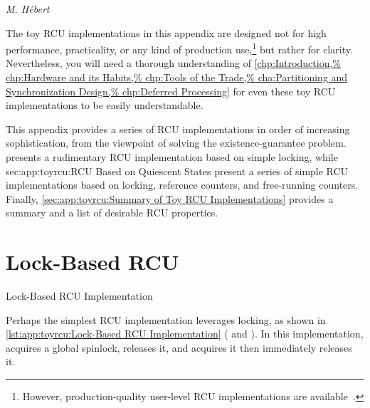 
%
	 {\emph{M. H\'ebert}}

The toy RCU implementations in this appendix are designed not for
high performance, practicality, or any kind of production use,\footnote{
	However, production-quality user-level RCU implementations
	are available~\cite{MathieuDesnoyers2009URCU,MathieuDesnoyers2012URCU}.}
but rather for clarity.
Nevertheless, you will need a thorough understanding of
\cref{chp:Introduction,%
chp:Hardware and its Habits,%
chp:Tools of the Trade,%
cha:Partitioning and Synchronization Design,%
chp:Deferred Processing}
for even these toy RCU implementations to be easily understandable.

This appendix provides a series of RCU implementations in order of
increasing sophistication, from the viewpoint of solving the
existence-guarantee problem.
 presents a rudimentary
RCU implementation based on simple locking, while
{sec:app:toyrcu:RCU Based on Quiescent States}
present a series of
simple RCU implementations based on locking, reference counters,
and free-running counters.
Finally, \cref{sec:app:toyrcu:Summary of Toy RCU Implementations}
provides a summary and a list of desirable RCU properties.

\section{Lock-Based RCU}
\label{sec:app:toyrcu:Lock-Based RCU}
\NoIndentAfterThis

\begin{listing}[htbp]
\vspace*{-11pt}
\caption{Lock-Based RCU Implementation}
\label{lst:app:toyrcu:Lock-Based RCU Implementation}
\end{listing}

Perhaps the simplest RCU implementation leverages locking, as
shown in
\cref{lst:app:toyrcu:Lock-Based RCU Implementation}
( and ).
In this implementation,  acquires a global
spinlock,  releases it, and
 acquires it then immediately releases it.

